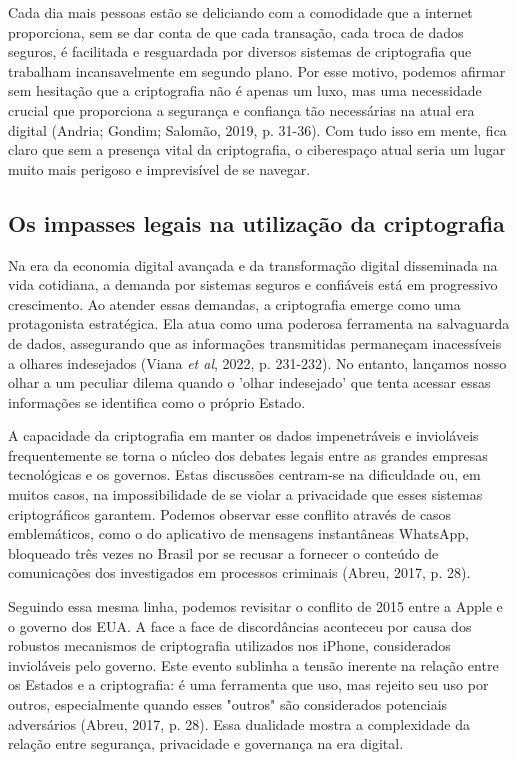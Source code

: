 Cada dia mais pessoas estão se deliciando com a comodidade que a internet
proporciona, sem se dar conta de que cada transação, cada troca de dados
seguros, é facilitada e resguardada por diversos sistemas de criptografia que
trabalham incansavelmente em segundo plano. Por esse motivo, podemos afirmar
sem hesitação que a criptografia não é apenas um luxo, mas uma necessidade
crucial que proporciona a segurança e confiança tão necessárias na atual era
digital (Andria; Gondim; Salomão, 2019, p. 31-36). Com tudo isso em mente,
fica claro que sem a presença vital da criptografia, o ciberespaço atual seria
um lugar muito mais perigoso e imprevisível de se navegar.

\subsection{Os impasses legais na utilização da criptografia}

Na era da economia digital avançada e da transformação digital disseminada na
vida cotidiana, a demanda por sistemas seguros e confiáveis está em progressivo
crescimento. Ao atender essas demandas, a criptografia emerge como uma
protagonista estratégica. Ela atua como uma poderosa ferramenta na salvaguarda
de dados, assegurando que as informações transmitidas permaneçam inacessíveis a
olhares indesejados (Viana \textit{et al}, 2022, p. 231-232). No entanto,
lançamos nosso olhar a um peculiar dilema quando o 'olhar indesejado' que tenta
acessar essas informações se identifica como o próprio Estado.

A capacidade da criptografia em manter os dados impenetráveis e invioláveis
frequentemente se torna o núcleo dos debates legais entre as grandes empresas
tecnológicas e os governos. Estas discussões centram-se na dificuldade ou, em
muitos casos, na impossibilidade de se violar a privacidade que esses sistemas
criptográficos garantem. Podemos observar esse conflito através de casos
emblemáticos, como o do aplicativo de mensagens instantâneas WhatsApp,
bloqueado três vezes no Brasil por se recusar a fornecer o conteúdo de
comunicações dos investigados em processos criminais (Abreu, 2017, p. 28).

Seguindo essa mesma linha, podemos revisitar o conflito de 2015 entre a Apple e
o governo dos EUA. A face a face de discordâncias aconteceu por causa dos
robustos mecanismos de criptografia utilizados nos iPhone, considerados
invioláveis pelo governo. Este evento sublinha a tensão inerente na relação
entre os Estados e a criptografia: é uma ferramenta que uso, mas rejeito seu
uso por outros, especialmente quando esses "outros" são considerados potenciais
adversários (Abreu, 2017, p. 28). Essa dualidade mostra a complexidade da
relação entre segurança, privacidade e governança na era digital.

